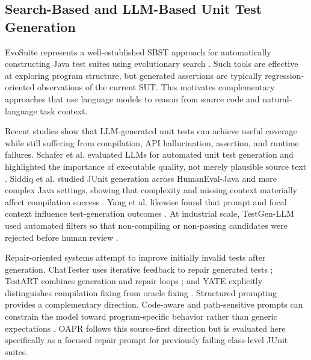 \documentclass[conference]{IEEEtran}
\begin{document}
\subsection{Search-Based and LLM-Based Unit Test Generation}
EvoSuite represents a well-established SBST approach for automatically constructing Java test suites using evolutionary search \cite{fraser2011evosuite}. Such tools are effective at exploring program structure, but generated assertions are typically regression-oriented observations of the current SUT. This motivates complementary approaches that use language models to reason from source code and natural-language task context.

Recent studies show that LLM-generated unit tests can achieve useful coverage while still suffering from compilation, API hallucination, assertion, and runtime failures. Schafer et al. evaluated LLMs for automated unit test generation and highlighted the importance of executable quality, not merely plausible source text \cite{schafer2024empirical}. Siddiq et al. studied JUnit generation across HumanEval-Java and more complex Java settings, showing that complexity and missing context materially affect compilation success \cite{siddiq2024junit}. Yang et al. likewise found that prompt and focal context influence test-generation outcomes \cite{yang2024evaluation}. At industrial scale, TestGen-LLM used automated filters so that non-compiling or non-passing candidates were rejected before human review \cite{alshahwan2024meta}.

Repair-oriented systems attempt to improve initially invalid tests after generation. ChatTester uses iterative feedback to repair generated tests \cite{yuan2024chattester}; TestART combines generation and repair loops \cite{gu2024testart}; and YATE explicitly distinguishes compilation fixing from oracle fixing \cite{konstantinou2025yate}. Structured prompting provides a complementary direction. Code-aware and path-sensitive prompts can constrain the model toward program-specific behavior rather than generic expectations \cite{ryan2024codeaware,wang2024hits}. OAPR follows this source-first direction but is evaluated here specifically as a focused repair prompt for previously failing class-level JUnit suites.
\end{document}
